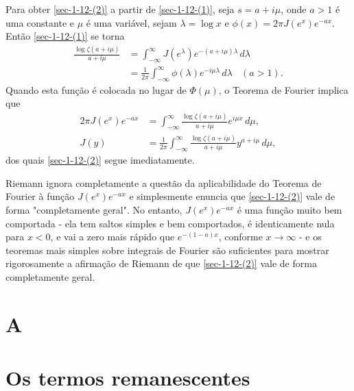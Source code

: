     Para obter \eqref{sec-1-12-(2)} a partir de \eqref{sec-1-12-(1)}, seja $s = a + i\mu$, onde $a>1$ é uma constante e $\mu$ é uma variável, sejam $\lambda = \log x$ e $\phi(x) = 2 \pi J(e^x) e^{-ax}$. Então \eqref{sec-1-12-(1)} se torna
    \begin{align*}
        \frac{\log \zeta(a + i\mu)}{a + i\mu} &= \int_{-\infty}^{\infty} J(e^{\lambda}) e^{-(a + i\mu)\lambda} \, d\lambda \\
        &= \frac{1}{2\pi} \int_{-\infty}^{\infty} \phi(\lambda) e^{-i\mu\lambda} \, d\lambda \ \ \ \ (a > 1).
    \end{align*}
    Quando esta função é colocada no lugar de $\Phi(\mu)$, o Teorema de Fourier implica que
    \begin{align*}
        2\pi J(e^x) e^{-ax} &= \int_{-\infty}^{\infty} \frac{\log \zeta(a + i\mu)}{a + i\mu} e^{i \mu x} \, d\mu, \\
        J(y) &= \frac{1}{2\pi} \int_{-\infty}^{\infty} \frac{\log \zeta(a + i\mu)}{a + i\mu} y^{a + i\mu} \, d\mu,
    \end{align*}
    dos quais \eqref{sec-1-12-(2)} segue imediatamente.
    
    Riemann ignora completamente a questão da aplicabilidade do Teorema de Fourier à função $J(e^x)e^{-ax}$ e simplesmente enuncia que \eqref{sec-1-12-(2)} vale de forma "completamente geral". No entanto, $J(e^x)e^{-ax}$ é uma função muito bem comportada - ela tem saltos simples e bem comportados, é identicamente nula para $x < 0$, e vai a zero mais rápido que $e^{-(1-a)x}$, conforme $x \to \infty$ - e os teoremas mais simples sobre integrais de Fourier são suficientes para mostrar rigorosamente a afirmação de Riemann de que \eqref{sec-1-12-(2)} vale de forma completamente geral.
    
    
    
    
    
    
    
    
    
    \section{A} \label{sec-1-14}
    \section{Os termos remanescentes} \label{sec-1-16}
    
    
    
    
    
    
    
    
    
    
    
    
    
    
    
    













